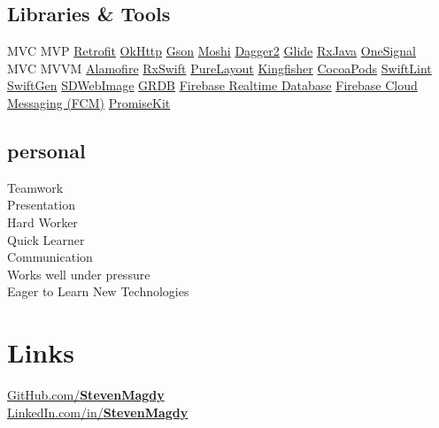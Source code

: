 \documentclass[]{Resume}
\begin{document}
\begin{minipage}[t]{0.33\textwidth}
\subsection{Libraries \& Tools}
MVC \textbullet{} MVP \textbullet{} \href{http://github.com/square/retrofit}{Retrofit} \textbullet{} \href{http://github.com/square/okhttp}{OkHttp} \textbullet{} \href{http://github.com/google/gson}{Gson} \textbullet{} \href{http://github.com/square/moshi}{Moshi} \textbullet{}
\href{http://github.com/google/dagger}{Dagger2} \textbullet{} \href{http://github.com/bumptech/glide}{Glide} \textbullet{} \href{http://github.com/ReactiveX/RxJava}{RxJava} \textbullet{} \href{http://onesignal.com/}{OneSignal}\\
\vspace{\topsep}
MVC \textbullet{} MVVM \textbullet{} \href{http://github.com/Alamofire/Alamofire}{Alamofire} \textbullet{} \href{http://github.com/ReactiveX/RxSwift}{RxSwift} \textbullet{} \href{http://github.com/PureLayout/PureLayout}{PureLayout} \textbullet{}
\href{http://github.com/onevcat/Kingfisher}{Kingfisher} \textbullet{} \href{http://cocoapods.org/}{CocoaPods} \textbullet{} \href{http://github.com/realm/SwiftLint}{SwiftLint} \textbullet{}
\href{http://github.com/SwiftGen/SwiftGen}{SwiftGen} \textbullet{} \href{http://github.com/SDWebImage/SDWebImage}{SDWebImage} \textbullet{} \href{http://github.com/groue/GRDB.swift}{GRDB} \textbullet{} \href{http://firebase.google.com/products/realtime-database}{Firebase Realtime Database} \textbullet{}
\href{http://firebase.google.com/products/cloud-messaging}{Firebase Cloud Messaging (FCM)} \textbullet{}
\href{http://github.com/mxcl/PromiseKit}{PromiseKit}
\sectionsep

\subsection{personal}
Teamwork\\
Presentation\\
Hard Worker\\
Quick Learner\\
Communication\\
Works well under pressure\\
Eager to Learn New Technologies
\sectionsep


\section{Links} 
\href{http://github.com/stevenmagdy}{GitHub.com/\bf StevenMagdy}\\
\href{http://www.linkedin.com/in/StevenMagdy}{LinkedIn.com/in/\bf StevenMagdy}

%
%

\end{minipage} 
\end{document}
